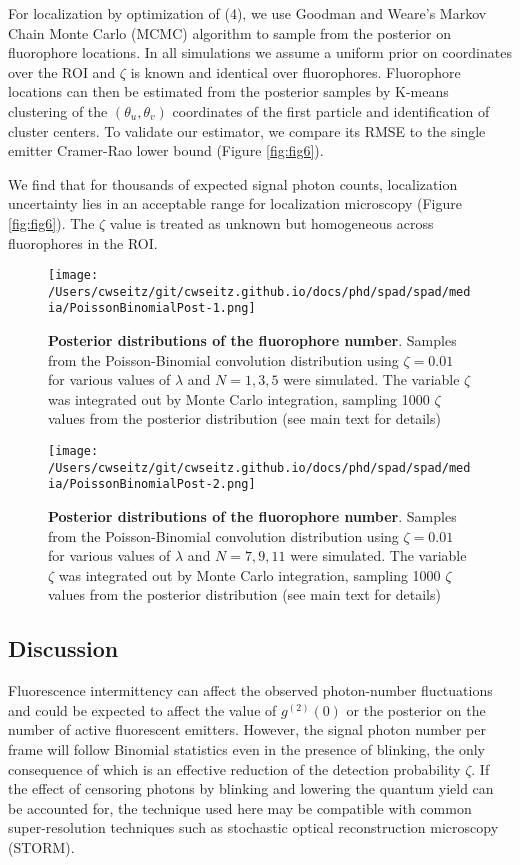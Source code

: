 For localization by optimization of (4), we use Goodman and Weare's Markov Chain Monte Carlo (MCMC) algorithm \parencite{Goodman2010} to sample from the posterior on fluorophore locations. In all simulations we assume a uniform prior on coordinates over the ROI and $\zeta$ is known and identical over fluorophores. Fluorophore locations can then be estimated from the posterior samples by K-means clustering of the $(\theta_u,\theta_v)$ coordinates of the first particle and identification of cluster centers. To validate our estimator, we compare its RMSE to the single emitter Cramer-Rao lower bound  (Figure \ref{fig:fig6}).

We find that for thousands of expected signal photon counts, localization uncertainty lies in an acceptable range for localization microscopy (Figure \ref{fig:fig6}). The $\zeta$ value is treated as unknown but homogeneous across fluorophores in the ROI.

\begin{figure*}[t]
\centering
\texttt{[image: /Users/cwseitz/git/cwseitz.github.io/docs/phd/spad/spad/media/PoissonBinomialPost-1.png]}
\caption{\textbf{Posterior distributions of the fluorophore number}. Samples from the Poisson-Binomial convolution distribution using $\zeta=0.01$ for various values of $\lambda$ and $N=1,3,5$ were simulated. The variable $\zeta$ was integrated out by Monte Carlo integration, sampling 1000 $\zeta$ values from the posterior distribution (see main text for details)}
\label{fig:fig9}
\end{figure*}    

\begin{figure*}[t]
\centering
\texttt{[image: /Users/cwseitz/git/cwseitz.github.io/docs/phd/spad/spad/media/PoissonBinomialPost-2.png]}
\caption{\textbf{Posterior distributions of the fluorophore number}. Samples from the Poisson-Binomial convolution distribution using $\zeta=0.01$ for various values of $\lambda$ and $N=7,9,11$ were simulated. The variable $\zeta$ was integrated out by Monte Carlo integration, sampling 1000 $\zeta$ values from the posterior distribution (see main text for details)}
\label{fig:fig10}
\end{figure*}    

\subsection{Discussion}

Fluorescence intermittency can affect the observed photon-number fluctuations and could be expected to affect the value of $g^{(2)}(0)$ or the posterior on the number of active fluorescent emitters. However, the signal photon number per frame will follow Binomial statistics even in the presence of blinking, the only consequence of which is an effective reduction of the detection probability $\zeta$. If the effect of censoring photons by blinking and lowering the quantum yield can be accounted for, the technique used here may be compatible with common super-resolution techniques such as stochastic optical reconstruction microscopy (STORM). 

